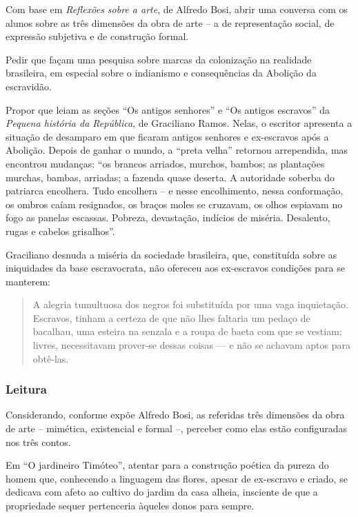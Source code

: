 \documentclass[11pt]{extarticle}
\begin{document}
Com base em \emph{Reflexões sobre a arte}, de Alfredo Bosi, abrir uma
conversa com os alunos sobre as três dimensões da obra de arte -- a de
representação social, de expressão subjetiva e de construção formal.

Pedir que façam uma pesquisa sobre marcas da colonização na realidade
brasileira, em especial sobre o indianismo e consequências da Abolição
da escravidão.

Propor que leiam as seções ``Os antigos senhores'' e ``Os antigos
escravos'' da \emph{Pequena história da República}, de Graciliano Ramos.
Nelas, o escritor apresenta a situação de desamparo em que ficaram
antigos senhores e ex-escravos após a Abolição. Depois de ganhar o
mundo, a ``preta velha'' retornou arrependida, mas encontrou mudanças:
``os brancos arriados, murchos, bambos; as plantações murchas, bambas,
arriadas; a fazenda quase deserta. A autoridade soberba do patriarca
encolhera. Tudo encolhera -- e nesse encolhimento, nessa conformação, os
ombros caíam resignados, os braços moles se cruzavam, os olhos espiavam
no fogo as panelas escassas. Pobreza, devastação, indícios de miséria.
Desalento, rugas e cabelos grisalhos''.

Graciliano desnuda a miséria da sociedade brasileira, que, constituída
sobre as iniquidades da base escravocrata, não ofereceu aos ex-escravos
condições para se manterem:

\begin{quote}
A alegria tumultuosa dos negros foi substituída por uma vaga
inquietação. Escravos, tinham a certeza de que não lhes faltaria um
pedaço de bacalhau, uma esteira na senzala e a roupa de baeta com que se
vestiam; livres, necessitavam prover-se dessas coisas --- e não se
achavam aptos para obtê-las.
\end{quote}

\subsubsection{Leitura}

Considerando, conforme expõe Alfredo Bosi, as referidas três dimensões
da obra de arte -- mimética, existencial e formal --, perceber como elas
estão configuradas nos três contos.

Em ``O jardineiro Timóteo'', atentar para a construção poética da pureza
do homem que, conhecendo a linguagem das flores, apesar de ex-escravo e
criado, se dedicava com afeto ao cultivo do jardim da casa alheia,
insciente de que a propriedade sequer pertenceria àqueles donos para
sempre.
\end{document}
